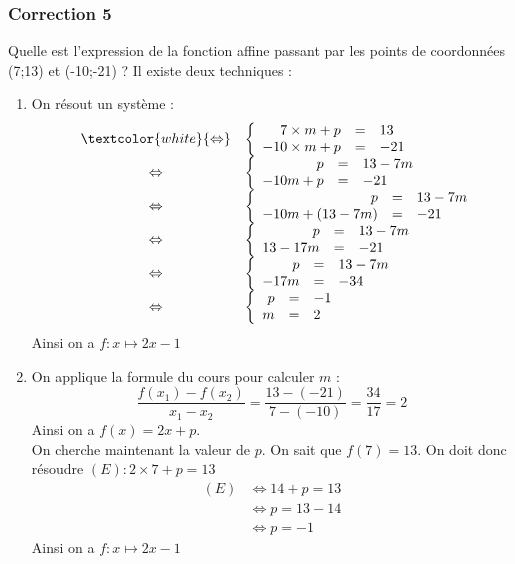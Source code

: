 \documentclass[15pt, mathserif]{beamer}
\begin{document}
\begin{frame}
\vspace{-10mm}
	\frametitle{Correction 5}
\vspace*{1cm} 
 \footnotesize{Quelle est l'expression de la fonction affine passant par les points de coordonnées (7;13) et (-10;-21) ? Il existe deux techniques :} 
 \begin{multicols}{2} 
 \begin{enumerate} 
 \item On résout un système : $$ \begin{array}{rcl} 
 & \textcolor{white}{\Leftrightarrow} & 
 \left 
 \{\begin{array}{rcl}7\times m + p&=&13 \\ 
 -10\times m+p&=&-21\end{array} \right. \\ 
 &\Leftrightarrow & \left 
 \{\begin{array}{rcl} p&=&13-7m \\ 
 -10m+p&=&-21\end{array} \right. \\ 
 &\Leftrightarrow & \left 
 \{\begin{array}{rcl} p&=&13-7m \\ 
 -10m+(13-7m) &=&-21\end{array} \right. \\ &\Leftrightarrow& \left \{\begin{array}{rcl}p&=&13-7m \\ 
 13-17m&=&-21\end{array} \right. \\ &\Leftrightarrow& \left \{\begin{array}{rcl}p&=&13-7m \\ 
 -17m&=&-34\end{array} \right. \\  &\Leftrightarrow& \left \{\begin{array}{rcl} p&=&-1 \\  m&=&2\end{array}\right. \end{array}$$ 
 Ainsi on a $f:x\mapsto 2x-1$ 
 \columnbreak 
 \item 
 \footnotesize{On applique la formule du cours pour calculer $m$ :$$ \dfrac{f(x_1)-f(x_2)}{x_1-x_2}=\dfrac{13-\left(-21\right)}{7-\left(-10\right)}= \dfrac{34}{17}=2$$} \footnotesize{ Ainsi on a $f(x)= 2x +p $. 
  \\ On cherche maintenant la valeur de $p$. On sait que $f(7)=13$. On doit donc résoudre $(E): 2\times7+p=13$}	 
 \begin{align*} (E)& \Leftrightarrow 14+p=13\\
		 	 & \Leftrightarrow p=13-14\\
			 & \Leftrightarrow p=-1
	 \end{align*} 
 Ainsi on a $f:x\mapsto 2x-1$ 
 \end{enumerate} 
 \end{multicols} 
 \end{frame}
\end{document}

